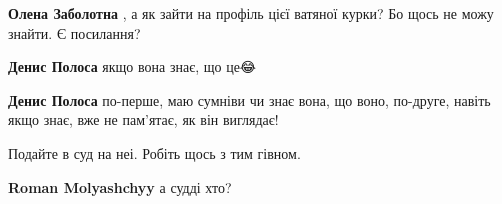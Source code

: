 \begin{itemize}
\begin{itemize}
\begin{itemize}
 
\textbf{Олена Заболотна} ,
а як зайти на профіль цієї ватяної курки?
Бо щось не можу знайти. Є посилання?
\end{itemize}

 
\textbf{Денис Полоса} якщо вона знає, що це😂

 
\textbf{Денис Полоса} по-перше, маю сумніви чи знає вона, що воно, по-друге, навіть якщо знає, вже не пам'ятає, як він виглядає!

\end{itemize}

 
Подайте в суд на неі. Робіть щось з тим гівном.

\begin{itemize}
 
\textbf{Roman Molyashchyy} а судді хто?
\begin{itemize}
 

\end{itemize}
\end{itemize}
\end{itemize}
